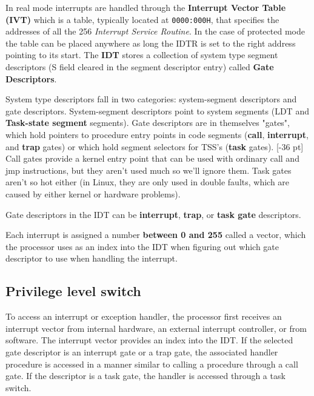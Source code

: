 \documentclass[twoside]{article}
\begin{document}
In real mode interrupts are handled through the \textbf{Interrupt Vector Table (IVT)} which is a table, typically located at \texttt{0000:000H}, that specifies the addresses of all the 256 \textit{Interrupt Service Routine}. In the case of protected mode the table can be placed anywhere as long the IDTR is set to the right address pointing to its start. The \textbf{IDT} stores a collection of system type segment descriptors (S field cleared in the segment descriptor entry) called \textbf{Gate Descriptors}.

System type descriptors fall in two categories: system-segment descriptors and gate descriptors. System-segment descriptors point to system segments (LDT and \textbf{Task-state segment} segments). Gate descriptors are in themselves "gates", which hold pointers to procedure entry points in code segments (\textbf{call}, \textbf{interrupt}, and \textbf{trap} gates) or which hold segment selectors for TSS’s (\textbf{task} gates). [-36 pt] Call gates provide a kernel entry point that can be used with ordinary call and jmp instructions, but they aren't used much so we'll ignore them. Task gates aren't so hot either (in Linux, they are only used in double faults, which are caused by either kernel or hardware problems). 

Gate descriptors in the IDT can be \textbf{interrupt}, \textbf{trap}, or \textbf{task gate} descriptors.

Each interrupt is assigned a number \textbf{between 0 and 255} called a vector, which the processor uses as an index into the IDT when figuring out which gate descriptor to use when handling the interrupt.

\subsection{Privilege level switch}

To access an interrupt or exception handler, the processor first receives an interrupt vector from internal hardware, an external interrupt controller, or
from software. The interrupt vector provides an index into the IDT. If the selected gate descriptor is an interrupt gate or a trap gate, the associated handler procedure is accessed in a manner similar to calling a procedure through a call gate. If the descriptor is a task gate, the handler is accessed through a task switch.
\end{document}
